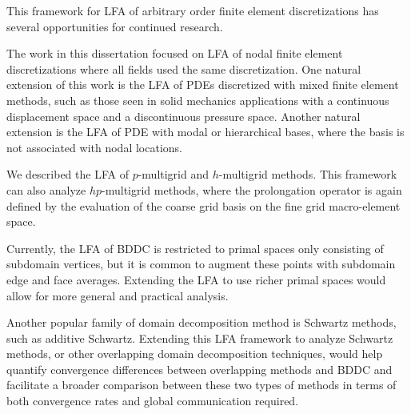 This framework for LFA of arbitrary order finite element discretizations has several opportunities for continued research.

The work in this dissertation focused on LFA of nodal finite element discretizations where all fields used the same discretization.
One natural extension of this work is the LFA of PDEs discretized with mixed finite element methods, such as those seen in solid mechanics applications with a continuous displacement space and a discontinuous pressure space.
Another natural extension is the LFA of PDE with modal or hierarchical bases, where the basis is not associated with nodal locations.

We described the LFA of $p$-multigrid and $h$-multigrid methods.
This framework can also analyze $hp$-multigrid methods, where the prolongation operator is again defined by the evaluation of the coarse grid basis on the fine grid macro-element space.

Currently, the LFA of BDDC is restricted to primal spaces only consisting of subdomain vertices, but it is common to augment these points with subdomain edge and face averages.
Extending the LFA to use richer primal spaces would allow for more general and practical analysis.

Another popular family of domain decomposition method is Schwartz methods, such as additive Schwartz.
Extending this LFA framework to analyze Schwartz methods, or other overlapping domain decomposition techniques, would help quantify convergence differences between overlapping methods and BDDC and facilitate a broader comparison between these two types of methods in terms of both convergence rates and global communication required.

